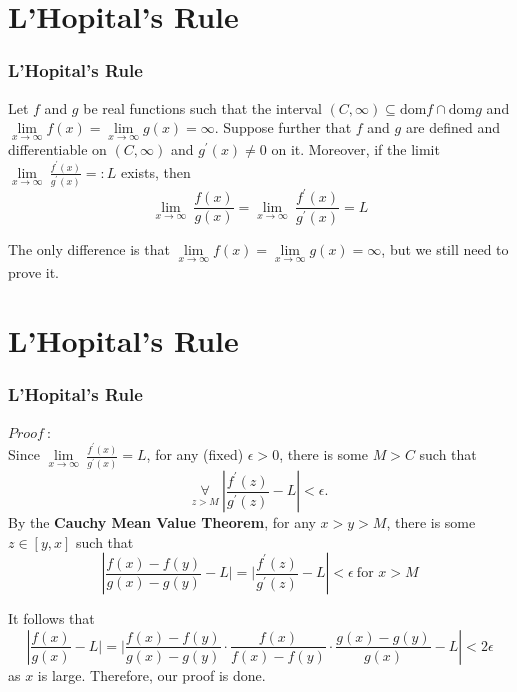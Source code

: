 \documentclass[12pt, t]{beamer}
\begin{document}
\section{L'Hopital's Rule}
\begin{frame}
    \frametitle{L'Hopital's Rule}
    Let $f$ and $g$ be real functions such that the interval $(C,\infty)\subseteq \mathrm{dom}f\cap \mathrm{dom}g$ and
    $\underset{x\rightarrow \infty }{\lim}f(x)=\underset{x\rightarrow \infty }{\lim}g(x)=\infty$. Suppose further that $f$ and $g$ are defined
    and differentiable on $(C,\infty)$ and $g^\prime (x)\neq 0$ on it. Moreover, if the limit $\underset{x\rightarrow \infty }{\lim}\ \frac{f^\prime (x)}{g^\prime (x)}=:L$ exists, then
    \begin{equation*}
        \underset{x\rightarrow\infty}{\lim}\ \frac{f(x)}{g(x)}=\underset{x\rightarrow\infty}{\lim}\ \frac{f^\prime (x)}{g^\prime (x)}=L
    \end{equation*}

    \vspace{0.5em}
    \hspace{1em}
    The only difference is that $\underset{x\rightarrow\infty}{\lim}f(x)=\underset{x\rightarrow \infty }{\lim}g(x)=\infty$, but we still need to
    prove it.


\end{frame}

\section{L'Hopital's Rule}
\begin{frame}
    \frametitle{L'Hopital's Rule}
    $Proof\ :$\\
    \hspace{1em}
    Since $\underset{x\rightarrow \infty }{\lim}\ \frac{f^\prime (x)}{g^\prime (x)}=L$, for any (fixed) $\epsilon>0$, there is some $M>C$ such that
    \begin{equation*}
        \underset{z>M}{\forall}\ \left\vert \frac{f^\prime (z)}{g^\prime (z)}-L \right\vert <\epsilon.
    \end{equation*}
    By the \textbf{Cauchy Mean Value Theorem}, for any $x>y>M$, there is some $z\in[y,x]$ such that
    \begin{equation*}
        \left\vert \frac{f(x)-f(y)}{g(x)-g(y)}-L|=|\frac{f^\prime (z)}{g^\prime (z)}-L \right\vert <\epsilon\ \text{for }x>M
    \end{equation*}

    It follows that
    \begin{equation*}
        \left\vert \frac{f(x)}{g(x)}-L|=|\frac{f(x)-f(y)}{g(x)-g(y)}\cdot\frac{f(x)}{f(x)-f(y)}\cdot\frac{g(x)-g(y)}{g(x)}-L \right\vert <2\epsilon
    \end{equation*}
    as $x$ is large. Therefore, our proof is done.
\end{frame}
\end{document}

